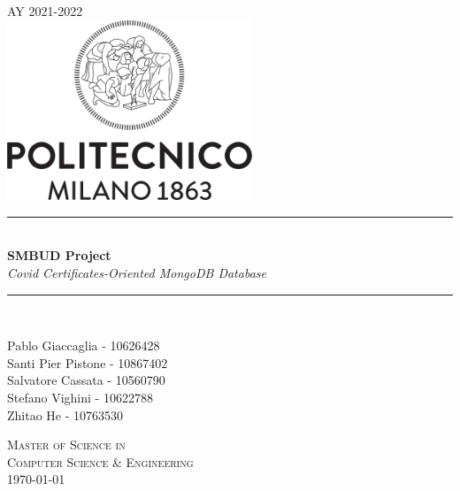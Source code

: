 \documentclass{article}[IEEEtran]
\newcommand{\HRule}{\rule{\linewidth}{0.5mm}}
\begin{document}
\begin{titlepage}
\begin{center}

\captionsetup{font=footnotesize}

\textsc{AY 2021-2022}\\[2cm]

\includegraphics[width=0.55\textwidth]{logo.png}~\\[2cm]


\HRule \\[0.4cm]
{ \LARGE 
  \textbf{SMBUD Project}\\[0.4cm]
  \emph{Covid Certificates-Oriented MongoDB Database}\\[0.4cm]
}
\HRule \\[1.5cm]



\begin{center}
    {\large Pablo Giaccaglia - 10626428\\[0.1cm]  Santi Pier Pistone - 10867402 \\[0.1cm]    Salvatore Cassata - 10560790\\[0.1cm]  Stefano Vighini - 10622788\\[0.1cm]  Zhitao He - 10763530\\[0.1cm] 
}
\end{center}

\vfill

\textsc{\large Master of Science in \\Computer Science \& Engineering}\\[0.4cm]


{\large \today}
 
\end{center}
\end{titlepage}

\newpage


\tableofcontents
{}
\newpage
\setcounter{page}{1}
\end{document}
